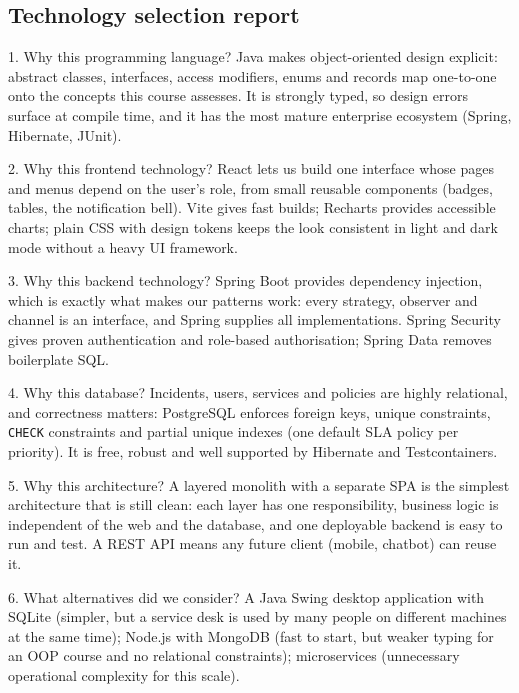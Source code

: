 \documentclass[11pt,a4paper]{article}
\begin{document}
\subsection{Technology selection report}
\begin{keybox}{1. Why this programming language?}
Java makes object-oriented design explicit: abstract classes, interfaces, access modifiers, enums and records map one-to-one onto the concepts this course assesses. It is strongly typed, so design errors surface at compile time, and it has the most mature enterprise ecosystem (Spring, Hibernate, JUnit).
\end{keybox}
\begin{keybox}{2. Why this frontend technology?}
React lets us build one interface whose pages and menus depend on the user's role, from small reusable components (badges, tables, the notification bell). Vite gives fast builds; Recharts provides accessible charts; plain CSS with design tokens keeps the look consistent in light and dark mode without a heavy UI framework.
\end{keybox}
\begin{keybox}{3. Why this backend technology?}
Spring Boot provides dependency injection, which is exactly what makes our patterns work: every strategy, observer and channel is an interface, and Spring supplies all implementations. Spring Security gives proven authentication and role-based authorisation; Spring Data removes boilerplate SQL.
\end{keybox}
\begin{keybox}{4. Why this database?}
Incidents, users, services and policies are highly relational, and correctness matters: PostgreSQL enforces foreign keys, unique constraints, \texttt{CHECK} constraints and partial unique indexes (one default SLA policy per priority). It is free, robust and well supported by Hibernate and Testcontainers.
\end{keybox}
\begin{keybox}{5. Why this architecture?}
A layered monolith with a separate SPA is the simplest architecture that is still clean: each layer has one responsibility, business logic is independent of the web and the database, and one deployable backend is easy to run and test. A REST API means any future client (mobile, chatbot) can reuse it.
\end{keybox}
\begin{keybox}{6. What alternatives did we consider?}
A Java Swing desktop application with SQLite (simpler, but a service desk is used by many people on different machines at the same time); Node.js with MongoDB (fast to start, but weaker typing for an OOP course and no relational constraints); microservices (unnecessary operational complexity for this scale).
\end{keybox}
\end{document}
